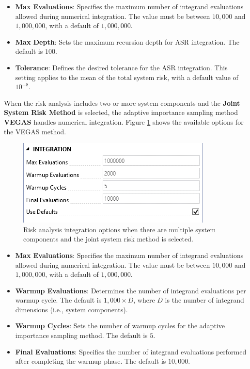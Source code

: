 \documentclass[
]{book}
\begin{document}
\begin{itemize}
\item
  \textbf{Max Evaluations}: Specifies the maximum number of integrand evaluations allowed during numerical integration. The value must be between \(10,000\) and \(1,000,000\), with a default of \(1,000,000\).
\item
  \textbf{Max Depth}: Sets the maximum recursion depth for ASR integration. The default is \(100\).
\item
  \textbf{Tolerance}: Defines the desired tolerance for the ASR integration. This setting applies to the mean of the total system risk, with a default value of \(10^{-8}\).
\end{itemize}

When the risk analysis includes two or more system components and the \textbf{Joint System Risk Method} is selected, the adaptive importance sampling method \textbf{VEGAS} handles numerical integration. Figure \ref{fig:figure-127} shows the available options for the VEGAS method.

\begin{figure}

{\centering \includegraphics{images/figure127} 

}

\caption{Risk analysis integration options when there are multiple system components and the joint system risk method is selected.}\label{fig:figure-127}
\end{figure}

\begin{itemize}
\item
  \textbf{Max Evaluations}: Specifies the maximum number of integrand evaluations allowed during numerical integration. The value must be between \(10,000\) and \(1,000,000\), with a default of \(1,000,000\).
\item
  \textbf{Warmup Evaluations}: Determines the number of integrand evaluations per warmup cycle. The default is \(1,000 \times D\), where \(D\) is the number of integrand dimensions (i.e., system components).
\item
  \textbf{Warmup Cycles}: Sets the number of warmup cycles for the adaptive importance sampling method. The default is \(5\).
\item
  \textbf{Final Evaluations}: Specifies the number of integrand evaluations performed after completing the warmup phase. The default is \(10,000\).
\end{itemize}
\end{document}
